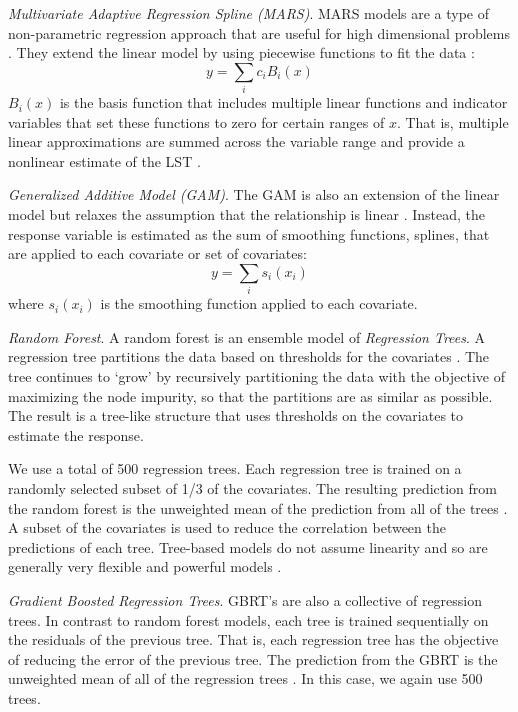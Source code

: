 \documentclass[final,3p,times,onecolumn,sort&compress]{elsarticle}
\begin{document}
\textit{Multivariate Adaptive Regression Spline (MARS)}. 
MARS models are a type of non-parametric regression approach that are useful for high dimensional problems \citep{Hastie2009-ky}. 
They extend the linear model by using piecewise functions to fit the data \citep{Friedman1991-of}: 
\begin{equation}
    \label{eqn:mars}
    y = \sum_i c_i B_i(x)
\end{equation}
$B_i(x)$ is the basis function that includes multiple linear functions and indicator variables that set these functions to zero for certain ranges of $x$.
That is, multiple linear approximations are summed across the variable range and provide a nonlinear estimate of the LST \citep{Friedman1991-of}. 

\textit{Generalized Additive Model (GAM)}. 
The GAM is also an extension of the linear model but relaxes the assumption that the relationship is linear \citep{Hastie1990-cg}.
Instead, the response variable is estimated as the sum of smoothing functions, splines, that are applied to each covariate or set of covariates:
\begin{equation}
    \label{eqn:gam}
    y = \sum_i s_i(x_i)
\end{equation}
where $s_i(x_i)$ is the smoothing function applied to each covariate.

\textit{Random Forest}. A random forest is an ensemble model of \textit{Regression Trees}. 
A regression tree partitions the data based on thresholds for the covariates \citep{Breiman1984-hw}. 
The tree continues to `grow' by recursively partitioning the data with the objective of maximizing the node impurity, so that the partitions are as similar as possible. 
The result is a tree-like structure that uses thresholds on the covariates to estimate the response.

We use a total of 500 regression trees.
Each regression tree is trained on a randomly selected subset of 1/3 of the covariates. 
The resulting prediction from the random forest is the unweighted mean of the prediction from all of the trees \citep{Breiman2001-rt}.
A subset of the covariates is used to reduce the correlation between the predictions of each tree.
Tree-based models do not assume linearity and so are generally very flexible and powerful models \citep{Breiman2001-rt, Geron2017-ek}.

\textit{Gradient Boosted Regression Trees}. 
GBRT's are also a collective of regression trees. 
In contrast to random forest models, each tree is trained sequentially on the residuals of the previous tree.
That is, each regression tree has the objective of reducing the error of the previous tree.
The prediction from the GBRT is the unweighted mean of all of the regression trees \citep{Geron2017-ek}.
In this case, we again use 500 trees.
\end{document}

